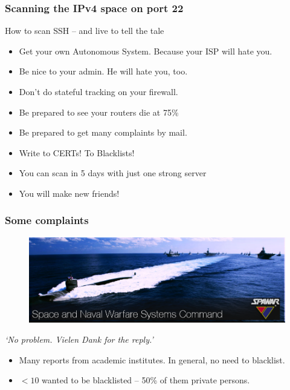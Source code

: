 \begin{frame}
\frametitle{Scanning the IPv4 space on port 22}
\pause
\begin{block}{How to scan SSH -- and live to tell the tale}
 \begin{itemize}
   \pause \item Get your own Autonomous System. \pause Because your ISP will hate you.
   \pause \item Be nice to your admin. He will hate you, too.
   \pause \item Don't do stateful tracking on your firewall.
   \pause \item Be prepared to see your routers die at 75\%
   \pause \item Be prepared to get many complaints by mail.
   \pause \item Write to CERTs! To Blacklists!
   \pause \item You can scan in 5 days with just one strong server
   \pause \item You will make new friends!
 \end{itemize}
\end{block}
\end{frame}


\begin{frame}
\frametitle{Some complaints}
\begin{block}{}
\vskip -1cm
\begin{figure}[t]
    \centering
    \includegraphics[scale=.4]{figures/bannerOverlay.png}
  \end{figure}
\pause \textit{`No problem. Vielen Dank  for the reply.'}
\end{block}
\pause
 \begin{itemize}
   \item Many reports from academic institutes. In general, no need to blacklist.
   \item $<10$ wanted to be blacklisted -- 50\% of them private persons.
 \end{itemize}
\end{frame}



